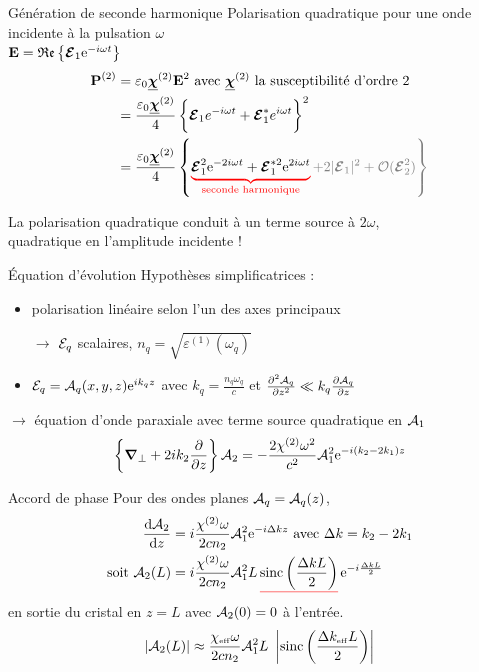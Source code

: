 \documentclass{beamer}
\newcommand{\chie}{\chi_\mathsc{eff}}
\newcommand{\dke}{\Delta k_\mathsc{eff}}
\begin{document}
\begin{frame}{Génération de seconde harmonique}
Polarisation quadratique pour une onde incidente à la pulsation $\omega$ \\
$\v E = \mathfrak{Re} \left\{ \v \E_1 \e{-i\omega t} \right\}$
\begin{align*}
\v P^{(2)} &= \varepsilon_0 \tens\chi^{(2)} \v E^2 \text{ avec $\tens\chi^{(2)}$ la susceptibilité d'ordre 2}\\
&= \frac{\varepsilon_0 \tens\chi^{(2)}}{4} \left\{\v\E_1 e^{-i\omega t} + \v\E_1^* e^{i\omega t} \vphantom{\frac12}\right\}^2 \\
&= \frac{\varepsilon_0 \tens\chi^{(2)}}{4} \left\{\ubrace{red}{\v\E_1^2 \e{-2i\omega t} + \v\E_1^{*2} \e{2i\omega t}}{seconde harmonique}
\color{gray} + 2|\v \E_1|^2 + \mathcal O(\v\E_2^2) \vphantom{\frac12} \right\} 
\end{align*}
\begin{beamerboxesrounded}[width=\textwidth]{}
La polarisation quadratique conduit à un terme source à $2\omega$,\\quadratique en l'amplitude incidente !
\end{beamerboxesrounded}
\end{frame}

\begin{frame}{Équation d'évolution}
Hypothèses simplificatrices :
\begin{itemize}
\item polarisation linéaire selon l'un des axes principaux
\item[$\rightarrow$] $\E_q$ scalaires, $n_q = \sqrt{ \varepsilon^{(1)}(\omega_q)}$
\item $\E_q = \A_q(x,y,z) \e{ik_qz}$ avec $k_q =\frac{n_q \omega_q}{c}$ et $\frac{\partial^2 \A_q}{\partial z^2} \ll k_q \frac{\partial \A_q}{\partial z}$
\end{itemize}
$\boldsymbol \rightarrow$ équation d'onde paraxiale avec terme source quadratique en $\A_1$
\begin{equation*}
\left\{\v\nabla_\bot + 2 i k_2 \frac{\partial}{\partial z} \right\} \A_2 = - \frac{2 \chi^{(2)} \omega^2}{c^2} \A_1^2 \e{- i (k_2 - 2k_1) z}
\end{equation*}
\end{frame}

\begin{frame}{Accord de phase}
Pour des ondes planes $\A_q = \A_q(z)$,
\begin{align*}
	\dv{\A_2}{z} &= i\frac{\chi^{(2)}\omega}{2cn_2} \A_1^2 \e{-i \Delta k z} \text{ avec } {\Delta k = k_2 - 2k_1} \label{eq:pwe} \\
	\text{soit } \A_2(L) &= i \frac{\chi^{(2)}\omega}{2 cn_2} \A_1^2 L\, \uline{red}{\operatorname{sinc}\left( \frac{\Delta k L}{2} \right)}\, \e{-i\frac{\Delta k L}{2}}
\end{align*}
en sortie du cristal en $z=L$ avec $\A_2(0)=0$ à l'entrée.
\begin{align*}
\left|\A_2(L)\right| \approx \frac{\chie\omega}{2 cn_2} \A_1^2 L\ \left|\operatorname{sinc}\left( \frac{\dke L}{2} \right)\right|
\end{align*}
\end{frame}
\end{document}
